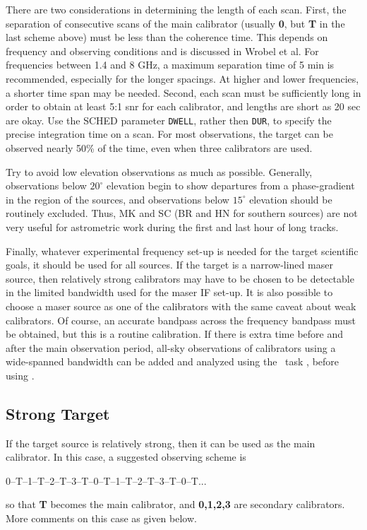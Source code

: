    There are two considerations in determining the length of each
scan.  First, the separation of consecutive scans of the main
calibrator (usually {\bf 0}, but {\bf T} in the last scheme above)
must be less than the coherence time.  This depends on frequency and
observing conditions and is discussed in Wrobel et al.  For
frequencies between 1.4 and 8 GHz, a maximum separation time of 5 min
is recommended, especially for the longer spacings.  At higher and
lower frequencies, a shorter time span may be needed.  Second, each
scan must be sufficiently long in order to obtain at least 5:1 snr for
each calibrator, and lengths are short as 20 sec are okay.  Use the
SCHED parameter {\tt DWELL}, rather then {\tt DUR}, to specify the
precise integration time on a scan.  For most observations, the target
can be observed nearly 50\% of the time, even when three calibrators
are used.

     Try to avoid low elevation observations as much as possible.
Generally, observations below $20^\circ$ elevation begin to show
departures from a phase-gradient in the region of the sources, and
observations below $15^\circ$ elevation should be routinely excluded.
Thus, MK and SC (BR and HN for southern sources) are not very useful
for astrometric work during the first and last hour of long tracks.

     Finally, whatever experimental frequency set-up is needed for the
target scientific goals, it should be used for all sources.  If the
target is a narrow-lined maser source, then relatively strong
calibrators may have to be chosen to be detectable in the limited
bandwidth used for the maser IF set-up.  It is also possible to choose
a maser source as one of the calibrators with the same caveat about
weak calibrators.  Of course, an accurate bandpass across the
frequency bandpass must be obtained, but this is a routine
calibration.  If there is extra time before and after the main
observation period, all-sky observations of calibrators using a
wide-spanned bandwidth can be added and analyzed using the \AIPS~task
\DELZN, before using \ATMCA.

\subsection{Strong Target}

     If the target source is relatively strong, then it can be used
as the main calibrator.  In this case, a suggested observing scheme is
\vskip 0.01cm\noindent
\centerline{0--T--1--T--2--T--3--T--0--T--1--T--2--T--3--T--0--T...}
\vskip 0.01cm\noindent so that {\bf T} becomes the main calibrator,
and {\bf 0,1,2,3} are secondary calibrators.  More comments on this
case as given below.

